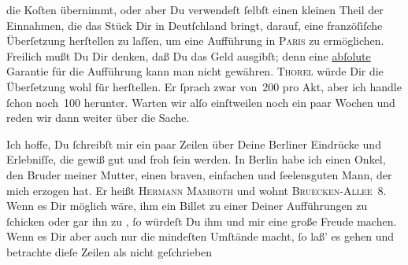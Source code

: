                die Koſten übernimmt, oder aber Du verwendeſt ſelbſt einen kleinen Theil der
               Einnahmen, die das Stück Dir
               in Deutſchland bringt, darauf, eine franzöſiſche
               Überſetzung herſtellen zu laſſen, um eine Aufführung in \textsc{Paris} zu ermöglichen. Freilich mußt Du Dir denken, daß Du das Geld \label{K_L02766-7v}\label{K_L02766-7} ausgibſt; denn eine \uline{abſolute} Garantie für die Aufführung kann man nicht gewähren. \textsc{Thorel} würde Dir die Überſetzung wohl für \label{K_L02766-8v}\label{K_L02766-8}{\pb}herſtellen. Er ſprach zwar von 200 pro Akt, aber ich handle ſchon
               noch 100 herunter. Warten wir alſo einſtweilen noch ein paar Wochen\strikeout{\textcolor{gray}{n}} und reden wir dann weiter über die Sache.\pend
           
\pstart
           Ich hoffe, Du ſchreibſt mir ein paar Zeilen über Deine Berliner Eindrücke und Erlebniſſe, die gewiß gut und froh ſein werden. In
                  Berlin habe ich einen Onkel, den Bruder meiner Mutter, einen braven, einfachen und  ſeelensguten {\pb}Mann\strikeout{\textcolor{gray}{e}}, der mich erzogen hat. Er heißt \textsc{Hermann Mamroth} und wohnt \textsc{Bruecken-Allee} 8. Wenn es Dir möglich wäre, ihm ein
               Billet zu einer Deiner Aufführungen zu ſchicken oder gar ihn zu \label{K_L02766-9v}\label{K_L02766-9}, ſo würdeſt  Du ihm und mir eine große Freude machen. Wenn es Dir
               aber auch nur die mindeſten Umſtände macht, ſo laß’  es gehen {\pb}und betrachte dieſe Zeilen
               als nicht geſchrieben{\dotsfive}\pend
           
